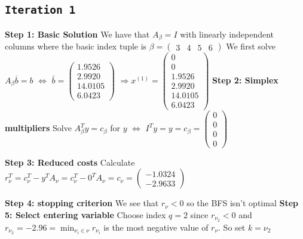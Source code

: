 \documentclass{assignment}
\def\code#1{\texttt{#1}}
\begin{document}
\subsection*{\code{Iteration 1}}
\begin{algorithmic}
    \State \textbf{Step 1: Basic Solution}
    \State  We have that $A_\beta = I$ with linearly independent columns where the basic index tuple is $\beta = \begin{pmatrix} 3 & 4 & 5 & 6\end{pmatrix}$
    \State We first solve $A_{\beta}\overline{b} = b$ $\Leftrightarrow$ $ \bar{b}= \begin{pmatrix}
1.9526 \\
2.9920 \\
14.0105 \\
6.0423
\end{pmatrix}$ $\Rightarrow x^{(1)} =  \begin{pmatrix} 0 \\ 0 \\
1.9526 \\
2.9920 \\
14.0105 \\
6.0423
\end{pmatrix}$
    \State \textbf{Step 2: Simplex multipliers}
    \State Solve $A_{\beta}^T y = c_{\beta}$ for $y$ $\Leftrightarrow$ $I^Ty = y = c_\beta = \begin{pmatrix}0 \\ 0 \\ 0 \\ 0\end{pmatrix}$ 
    
    \State \textbf{Step 3: Reduced costs}
    \State Calculate $r_{\nu}^T = c_{\nu}^T - y^T A_{\nu} = c_{\nu}^T - 0^T A_\nu = c_\nu = \begin{pmatrix}-1.0324 \\ -2.9633 \end{pmatrix}$
    
    \State \textbf{Step 4: stopping criterion} 
    \State We see that $r_\nu < 0$ so the BFS isn't optimal
    \State \textbf{Step 5: Select entering variable}
    \State Choose index $q = 2$ since $r_{\nu_2} < 0$ and $r_{\nu_2} = -2.96 = \min_{\nu_i \in \nu} r_{\nu_i}$ is the most negative value of $r_\nu$. 
    \State So set $k = \nu_2$
        

\end{algorithmic}
\end{document}
